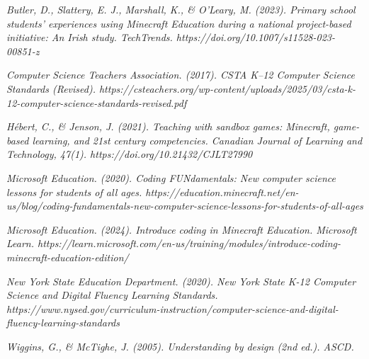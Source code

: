 \documentclass[11pt,letterpaper]{article}
\begin{document}
\textit{Butler, D., Slattery, E. J., Marshall, K., \& O'Leary, M. (2023). Primary school students' experiences using Minecraft Education during a national project-based initiative: An Irish study. TechTrends. https://doi.org/10.1007/s11528-023-00851-z}

\textit{Computer Science Teachers Association. (2017). CSTA K--12 Computer Science Standards (Revised). https://csteachers.org/wp-content/uploads/2025/03/csta-k-12-computer-science-standards-revised.pdf}

\textit{H\'ebert, C., \& Jenson, J. (2021). Teaching with sandbox games: Minecraft, game-based learning, and 21st century competencies. Canadian Journal of Learning and Technology, 47(1). https://doi.org/10.21432/CJLT27990}

\textit{Microsoft Education. (2020). Coding FUNdamentals: New computer science lessons for students of all ages. https://education.minecraft.net/en-us/blog/coding-fundamentals-new-computer-science-lessons-for-students-of-all-ages}

\textit{Microsoft Education. (2024). Introduce coding in Minecraft Education. Microsoft Learn. https://learn.microsoft.com/en-us/training/modules/introduce-coding-minecraft-education-edition/}

\textit{New York State Education Department. (2020). New York State K-12 Computer Science and Digital Fluency Learning Standards. https://www.nysed.gov/curriculum-instruction/computer-science-and-digital-fluency-learning-standards}

\textit{Wiggins, G., \& McTighe, J. (2005). Understanding by design (2nd ed.). ASCD.}
\end{document}
